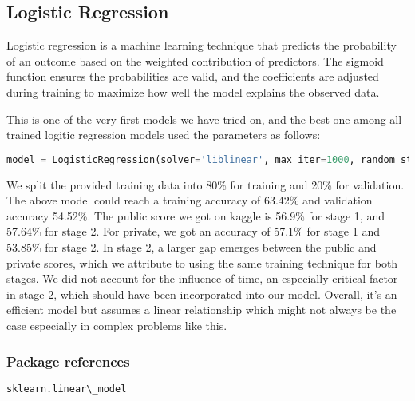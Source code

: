 \subsection*{Logistic Regression}

\quad Logistic regression is a machine learning technique that predicts the probability of an outcome based on the weighted contribution of predictors. The sigmoid function ensures the probabilities are valid, and the coefficients are adjusted during training to maximize how well the model explains the observed data. 

This is one of the very first models we have tried on, and the best one among all trained logitic regression models used the parameters as follows: 

\begin{lstlisting}[language=Python]
model = LogisticRegression(solver='liblinear', max_iter=1000, random_state=42)
\end{lstlisting}

We split the provided training data into 80\% for training and 20\% for validation. The above model could reach a training accuracy of 63.42\% and validation accuracy 54.52\%. The public score we got on kaggle is 56.9\% for stage 1, and 57.64\% for stage 2. For private, we got an accuracy of 57.1\% for stage 1 and 53.85\% for stage 2. In stage 2, a larger gap emerges between the public and private scores, which we attribute to using the same training technique for both stages. We did not account for the influence of time, an especially critical factor in stage 2, which should have been incorporated into our model. Overall, it's an efficient model but assumes a linear relationship which might not always be the case especially in complex problems like this.

\subsubsection*{Package references}
\begin{lstlisting}[language=Python]
sklearn.linear\_model
\end{lstlisting}
